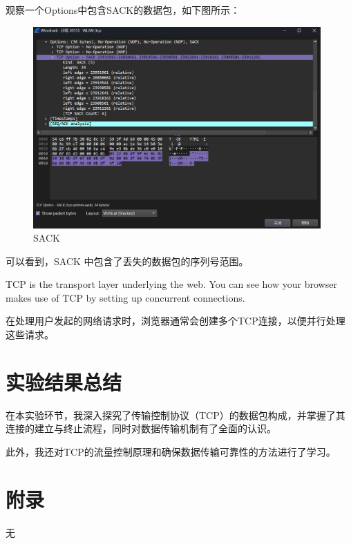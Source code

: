 \documentclass{article}
\begin{document}
	\begin{tcolorbox}[title = {Answer-3}, colback = blue!25!white, colframe = blue!75!black]	
		观察一个Options中包含SACK的数据包，如下图所示：
		
		\begin{figure}[H]
			\centering
			\includegraphics[width=11cm]{images/31.SACK.png}
			\caption{SACK}
		\end{figure}
		
		可以看到，SACK 中包含了丢失的数据包的序列号范围。
	\end{tcolorbox}
	
	\begin{tcolorbox}[title = {Question-4}, colback = red!25!white, colframe = red!75!black]
		TCP is the transport layer underlying the web. You can see how your browser makes use of TCP by setting up concurrent connections.
	\end{tcolorbox}
	
	\begin{tcolorbox}[title = {Answer-4}, colback = blue!25!white, colframe = blue!75!black]
		在处理用户发起的网络请求时，浏览器通常会创建多个TCP连接，以便并行处理这些请求。
	\end{tcolorbox}
	
	\section{实验结果总结}
	
	在本实验环节，我深入探究了传输控制协议（TCP）的数据包构成，并掌握了其连接的建立与终止流程，同时对数据传输机制有了全面的认识。
	
	此外，我还对TCP的流量控制原理和确保数据传输可靠性的方法进行了学习。
	
	\section{附录}
	
	无
	
\end{document}
